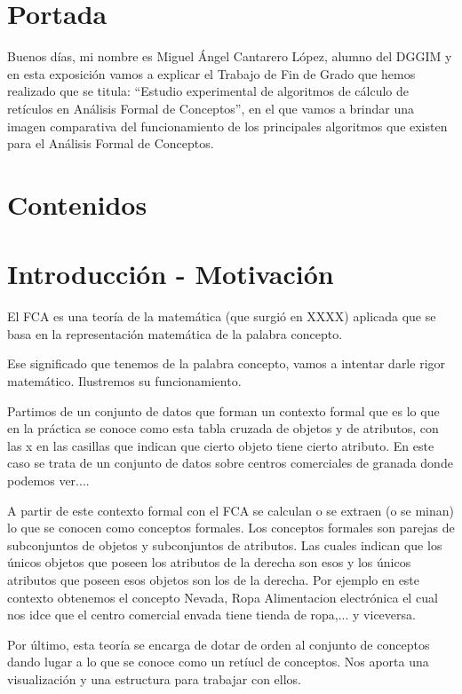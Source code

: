 \documentclass{article}
\begin{document}
\section{Portada}

Buenos días, mi nombre es Miguel Ángel Cantarero López, alumno del DGGIM y en esta exposición vamos a explicar el Trabajo de Fin de Grado que hemos realizado que se titula: ``Estudio experimental de algoritmos de cálculo de retículos en Análisis Formal de Conceptos'', en el que vamos a brindar una imagen comparativa del funcionamiento de los principales algoritmos que existen para el Análisis Formal de Conceptos.


\section{Contenidos}

\section{Introducción - Motivación}

El FCA es una teoría de la matemática (que surgió en XXXX) aplicada que se basa en la representación matemática de la palabra concepto. 

Ese significado que tenemos de la palabra concepto, vamos a intentar darle rigor matemático. Ilustremos su funcionamiento.

 Partimos de un conjunto de datos que forman un contexto formal que es lo que en la práctica se conoce como esta tabla cruzada de objetos y de atributos, con las x en las casillas que indican que cierto objeto tiene cierto atributo. En este caso se trata de un conjunto de datos sobre centros comerciales de granada donde podemos ver....

A partir de este contexto formal con el FCA se calculan o se extraen (o se minan) lo que se conocen como conceptos formales. Los conceptos formales son parejas de subconjuntos de objetos y subconjuntos de atributos. Las cuales indican que los únicos objetos que poseen los atributos de la derecha son esos y los únicos atributos que poseen esos objetos son los de la derecha.
Por ejemplo en este contexto obtenemos el concepto Nevada, Ropa Alimentacion electrónica el cual nos idce que el centro comercial envada tiene tienda de ropa,... y viceversa.

Por último, esta teoría se encarga de dotar de orden al conjunto de conceptos dando lugar a lo que se conoce como un retíucl de conceptos. Nos aporta una visualización y una estructura para trabajar con ellos. 
\end{document}
